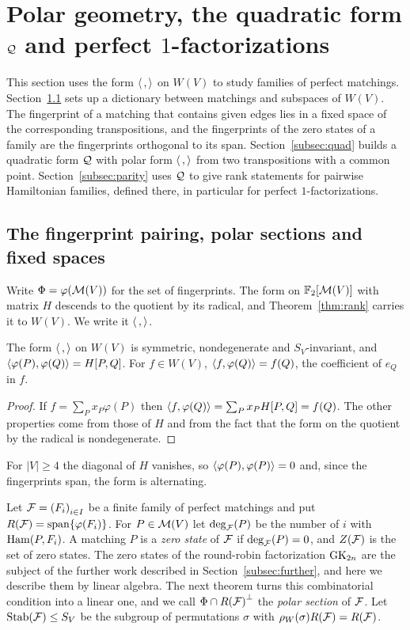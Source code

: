 \section{Polar geometry, the quadratic form \texorpdfstring{$\mathcal{Q}$}{Q} and perfect \texorpdfstring{$1$}{1}-factorizations}\label{sec:polar}

This section uses the form $\langle\,,\rangle$ on $W(V)$ to study families of perfect matchings. Section~\ref{subsec:fixed} sets up a dictionary between matchings and subspaces of $W(V)$. The fingerprint of a matching that contains given edges lies in a fixed space of the corresponding transpositions, and the fingerprints of the zero states of a family are the fingerprints orthogonal to its span. Section~\ref{subsec:quad} builds a quadratic form $\mathcal{Q}$ with polar form $\langle\,,\rangle$ from two transpositions with a common point. Section~\ref{subsec:parity} uses $\mathcal{Q}$ to give rank statements for pairwise Hamiltonian families, defined there, in particular for perfect $1$-factorizations.

\subsection{The fingerprint pairing, polar sections and fixed spaces}\label{subsec:fixed}

Write $\Phi=\varphi(\mathcal{M}(V))$ for the set of fingerprints. The form on $\mathbb{F}_2[\mathcal{M}(V)]$ with matrix $H$ descends to the quotient by its radical, and Theorem~\ref{thm:rank} carries it to $W(V)$. We write it $\langle\,,\rangle$.

\begin{proposition}\label{prop:fpform}
The form $\langle\,,\rangle$ on $W(V)$ is symmetric, nondegenerate and $S_V$-invariant, and $\langle\varphi(P),\varphi(Q)\rangle=H[P,Q]$. For $f\in W(V)$, $\langle f,\varphi(Q)\rangle=f(Q)$, the coefficient of $e_Q$ in $f$.
\end{proposition}

\begin{proof}
If $f=\sum_{P}x_P\varphi(P)$ then $\langle f,\varphi(Q)\rangle=\sum_{P}x_{P}H[P,Q]=f(Q)$. The other properties come from those of $H$ and from the fact that the form on the quotient by the radical is nondegenerate.
\end{proof}

For $|V|\ge4$ the diagonal of $H$ vanishes, so $\langle\varphi(P),\varphi(P)\rangle=0$ and, since the fingerprints span, the form is alternating.

Let $\mathcal{F}={(F_i)}_{i\in I}$ be a finite family of perfect matchings and put $R(\mathcal{F})=\operatorname{span}\{\varphi(F_i)\}$. For $P\in\mathcal{M}(V)$ let $\deg_{\mathcal{F}}(P)$ be the number of $i$ with $\operatorname{Ham}(P,F_i)$. A matching $P$ is a \emph{zero state} of $\mathcal{F}$ if $\deg_{\mathcal{F}}(P)=0$, and $Z(\mathcal{F})$ is the set of zero states. The zero states of the round-robin factorization $\mathrm{GK}_{2n}$ are the subject of the further work described in Section~\ref{subsec:further}, and here we describe them by linear algebra. The next theorem turns this combinatorial condition into a linear one, and we call $\Phi\cap{R(\mathcal{F})}^\perp$ the \emph{polar section} of $\mathcal{F}$. Let $\mathrm{Stab}(\mathcal{F})\le S_V$ be the subgroup of permutations $\sigma$ with $\rho_W(\sigma)R(\mathcal{F})=R(\mathcal{F})$.

